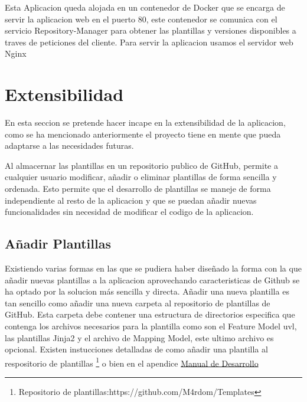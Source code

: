 \documentclass[12pt, a4paper, twoside]{article}
\begin{document}
Esta Aplicacion queda alojada en un contenedor de Docker que se encarga de servir la aplicacion web en el puerto 80, este contenedor se comunica con el servicio Repository-Manager para obtener las plantillas y versiones disponibles a traves de peticiones del cliente.
Para servir la aplicacion usamos el servidor web Nginx













\section{Extensibilidad}
\label{sec:Extensibilidad}
En esta seccion se pretende hacer incape en la extensibilidad de la aplicacion, como se ha mencionado anteriormente el proyecto tiene en mente que pueda adaptarse a las necesidades futuras.

Al almacernar las plantillas en un repositorio publico de GitHub, permite a cualquier usuario modificar, añadir o eliminar plantillas de forma sencilla y ordenada.
Esto permite que el desarrollo de plantillas se maneje de forma independiente al resto de la aplicacion y que se puedan añadir nuevas funcionalidades sin necesidad de modificar el codigo de la aplicacion.
\subsection{Añadir Plantillas}
Existiendo varias formas en las que se pudiera haber diseñado la forma con la que añadir nuevas plantillas a la aplicacion aprovechando caracteristicas de Github se ha optado por la solucion más sencilla y directa.
Añadir una nueva plantilla es tan sencillo como añadir una nueva carpeta al repositorio de plantillas de GitHub.
Esta carpeta debe contener una estructura de directorios especifica que contenga los archivos necesarios para la plantilla como son el Feature Model uvl, las plantillas Jinja2 y el archivo de Mapping Model, este ultimo archivo es opcional.
Existen instucciones detalladas de como añadir una plantilla al respositorio de plantillas \footnote{Repositorio de plantillas:https://github.com/M4rdom/Templates} o bien en el apendice \hyperref[sec:Manual de Desarrollo]{Manual de Desarrollo}

\newpage
\end{document}
